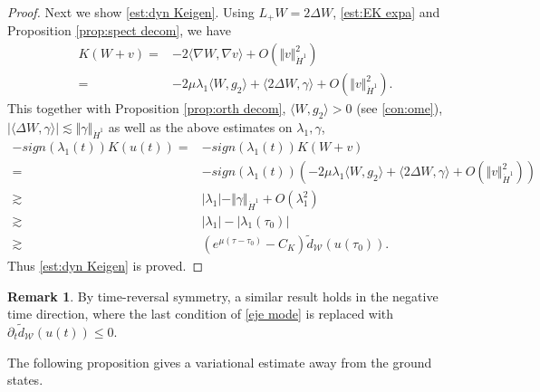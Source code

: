 \documentclass[reqno, 11pt]{amsart}
\numberwithin{equation}{section}
\theoremstyle{plain}
\theoremstyle{definition}
\newtheorem{remark}[theorem]{Remark}
\numberwithin{equation}{section}
\numberwithin{theorem}{section}
\numberwithin{equation}{section}
\numberwithin{equation}{section}
\numberwithin{theorem}{section}
\begin{document}
\begin{proof}
		Next we show \eqref{est:dyn Keigen}. Using $L_{+}W=2\Delta W$, \eqref{est:EK expa} and Proposition \ref{prop:spect decom}, we have 
		\begin{equation}\label{est:K expa}
		\begin{aligned}
		K(W+v)=&-2\langle \nabla W,\nabla v \rangle+O(\Vert v\Vert_{\dot H^1}^2)\\=&-2\mu\lambda_{1} \langle W,g_2 \rangle+\langle 2\Delta W,\gamma \rangle+O(\Vert v\Vert_{\dot H^1}^2).
		\end{aligned}
		\end{equation}
		This together with Proposition \ref{prop:orth decom}, $\langle W,g_2 \rangle>0$ (see \eqref{con:ome}), $|\langle \Delta W,\gamma \rangle|\lesssim \Vert \gamma\Vert_{\dot H^1}$ as well as the above estimates on $\lambda_{1},\gamma$, 
		\begin{equation*}
		\begin{aligned}
		-sign(\lambda_{1}(t)) K(u(t))=&-sign(\lambda_{1}(t)) K(W+v)\\=&-sign(\lambda_{1}(t)) \left( -2\mu\lambda_{1} \langle W,g_2 \rangle+\langle 2\Delta W,\gamma \rangle+O(\Vert v\Vert_{\dot H^1}^2) \right)\\\gtrsim&|\lambda_{1}|-\Vert \gamma\Vert_{\dot H^1}+O(\lambda_{1}^2)\\\gtrsim&|\lambda_{1}|-|\lambda_{1}(\tau_0)|\\\gtrsim& \left( e^{\mu(\tau-\tau_0 )}-C_K \right)\widetilde{d}_{\mathcal{W}}(u(\tau_0)).
		\end{aligned}
		\end{equation*}
		Thus \eqref{est:dyn Keigen} is proved.
	\end{proof}	
	\begin{remark}
		By time-reversal symmetry, a similar result holds in the negative time direction, where the last condition of \eqref{eje mode} is replaced with $\partial_{t}\widetilde{d}_{\mathcal{W}}(u(t))\leq 0$.
	\end{remark}	
	
	
	
	
	The following proposition gives a variational estimate away from the ground states.
	
\end{document}
